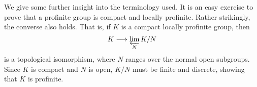 We give some further insight into the terminology used. It is an easy exercise to prove that a profinite group is compact and locally profinite. Rather strikingly, the converse also holds. That is, if $K$ is a compact locally profinite group, then
$$K\longrightarrow\varprojlim_N K/N$$
is a topological isomorphism, where $N$ ranges over the normal open subgroups. Since $K$ is compact and $N$ is open, $K/N$ must be finite and discrete, showing that $K$ is profinite.

